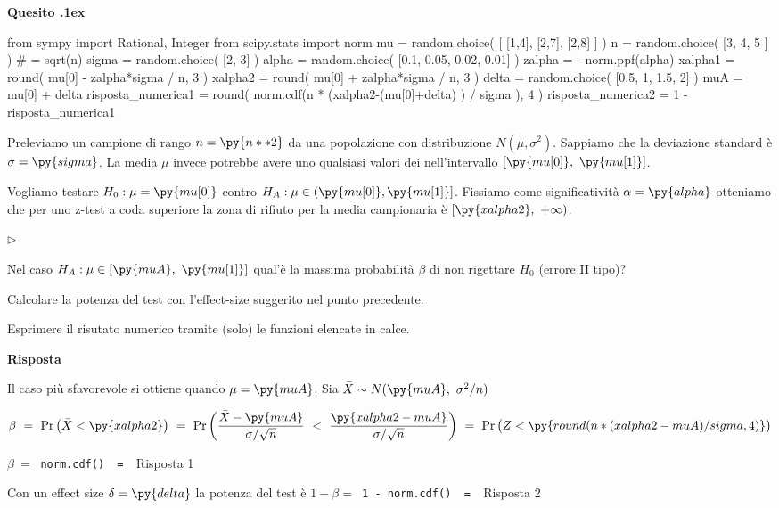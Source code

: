 \documentclass[11pt,twoside,a4paper]{article}
\newcommand{\mylabel}[1]{#1\hfill}
\renewenvironment{itemize}
  {\begin{list}{$\triangleright$}{%
   \setlength{\parskip}{0mm}
   \setlength{\topsep}{.4\baselineskip}
   \setlength{\rightmargin}{0mm}
   \setlength{\listparindent}{0mm}
   \setlength{\itemindent}{0mm}
   \setlength{\labelwidth}{2ex}
   \setlength{\itemsep}{.4\baselineskip}
   \setlength{\parsep}{0mm}
   \setlength{\partopsep}{0mm}
   \setlength{\labelsep}{1ex}
   \setlength{\leftmargin}{\labelwidth+\labelsep}
   \let\makelabel\mylabel}}{%
   \end{list}\vspace*{-1.3mm}}
\def\Pr{{\rm Pr\,}}
\newcounter{quesito}
\newenvironment{question}{\bigskip\addtocounter{quesito}{1}\par\textbf{Quesito \thequesito.\kern1ex}}{\vspace{\parskip}}
\newenvironment{answer}{\par\textbf{Risposta\quad}}{\vspace{\parskip}}
\begin{document}
\begin{question} %
\begin{pycode}
from sympy import Rational, Integer
from scipy.stats import norm
mu = random.choice( [ [1,4], [2,7], [2,8] ] )
n = random.choice( [3, 4, 5 ] ) # = sqrt(n)
sigma = random.choice( [2, 3] )
alpha = random.choice( [0.1, 0.05, 0.02, 0.01] )
zalpha = - norm.ppf(alpha) 
xalpha1 = round( mu[0] - zalpha*sigma / n, 3 )
xalpha2 = round( mu[0] + zalpha*sigma / n, 3 )
delta = random.choice( [0.5, 1, 1.5, 2] )
muA = mu[0] + delta
risposta_numerica1 = round( norm.cdf(n * (xalpha2-(mu[0]+delta) ) / sigma ), 4 )
risposta_numerica2 = 1 - risposta_numerica1
\end{pycode}
Preleviamo un campione di rango $n=\py{n**2}$ da una popolazione con distribuzione $N(\mu,\sigma^2)$. Sappiamo che la deviazione standard è $\sigma=\py{sigma}$. La media $\mu$ invece potrebbe avere uno qualsiasi valori dei nell'intervallo $[\py{mu[0]},\ \py{mu[1]}  ]$.

Vogliamo testare $H_0:\mu=\py{mu[0]}$ contro $H_A:\mu\in (\py{mu[0]},\py{mu[1]}]$. Fissiamo come significatività $\alpha=\py{alpha}$ otteniamo che per uno z-test a coda superiore la zona di rifiuto per la media campionaria è $[\py{xalpha2}, \ +\infty)$.

\begin{itemize}
\item[1.] Nel caso $H_A:\mu\in [\py{muA},\ \py{mu[1]}]$ qual'è la massima probabilità $\beta$ di non rigettare $H_0$ (errore II tipo)?
\item[2.] Calcolare la potenza del test con l'effect-size suggerito nel punto precedente.
\end{itemize}

Esprimere il risutato numerico tramite (solo) le funzioni elencate in calce.

\begin{answer}

Il caso più sfavorevole si ottiene quando $\mu = \py{muA}$. Sia $\bar X\sim N(\py{muA},\ \sigma^2/n)$

$\beta
\ =\ 
\Pr\big(\bar X < \py{xalpha2} \big)
\ =\ 
\Pr\bigg( \dfrac{\bar X - \py{muA} }{\sigma/\sqrt{n}}\ <\ \dfrac{\py{xalpha2-muA} }{\sigma/\sqrt{n} }\bigg)
\ =\ 
\Pr\big( Z<  \py{round( n * (xalpha2-muA ) / sigma, 4) }\big)$


{\color{blue}$\beta
\ =\ $}
{\color{blue}\tt norm.cdf() }{\tt\ =\  }{\color{blue}\hfill Risposta 1}

\medskip
Con un effect size $\delta=\py{delta}$ la potenza del test è $1-\beta=${\color{blue}\tt\ 1 - norm.cdf() }{\tt\ =\  }{\color{blue}\hfill Risposta 2}

\end{answer}
\end{question}
\end{document}

